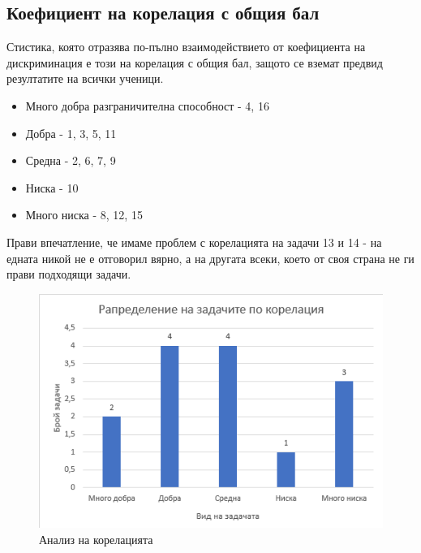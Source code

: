 \subsection{Коефициент на корелация с общия бал}
Стистика, която отразява по-пълно взаимодействието от коефициента на дискриминация е този на корелация с общия бал, защото се вземат предвид резултатите на всички ученици.
\begin{itemize}
    \item Много добра разграничителна способност - 4, 16
    \item Добра - 1, 3, 5, 11
    \item Средна - 2, 6, 7, 9
    \item Ниска - 10
    \item Много ниска - 8, 12, 15
\end{itemize}
Прави впечатление, че имаме проблем с корелацията на задачи 13 и 14 - на едната никой не е отговорил вярно, а на другата всеки, което от своя страна не ги прави подходящи задачи.
\begin{figure}[H]
    \centering
    \includegraphics[width=\linewidth]{resources/korelaciq.png}
    \caption{Анализ на корелацията}
\end{figure}

